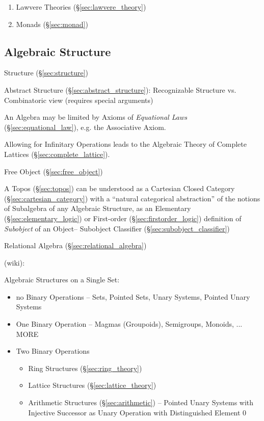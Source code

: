 \begin{enumerate}
  \item Lawvere Theories (\S\ref{sec:lawvere_theory})
  \item Monads (\S\ref{sec:monad})
\end{enumerate}



\subsection{Algebraic Structure}\label{sec:algebraic_structure}

Structure (\S\ref{sec:structure})

Abstract Structure (\S\ref{sec:abstract_structure}): Recognizable
Structure vs. Combinatoric view (requires special arguments)

An Algebra may be limited by Axioms of \emph{Equational Laws}
(\S\ref{sec:equational_law}), e.g. the Associative Axiom.

Allowing for Infinitary Operations leads to the Algebraic Theory of
Complete Lattices (\S\ref{sec:complete_lattice}).

Free Object (\S\ref{sec:free_object})

\fist A Topos (\S\ref{sec:topos}) can be understood as a Cartesian Closed
Category (\S\ref{sec:cartesian_category}) with a ``natural categorical
abstraction'' of the notions of Subalgebra of any Algebraic Structure, as an
Elementary (\S\ref{sec:elementary_logic}) or First-order
(\S\ref{sec:firstorder_logic}) definition of \emph{Subobject} of an Object--
Subobject Classifier (\S\ref{sec:subobject_classifier})

\fist Relational Algebra (\S\ref{sec:relational_algebra})

(wiki):

Algebraic Structures on a Single Set:

\begin{itemize}
  \item no Binary Operations -- Sets, Pointed Sets, Unary Systems, Pointed
    Unary Systems
  \item One Binary Operation -- Magmas (Groupoids), Semigroups, Monoids, ...
    MORE
  \item Two Binary Operations
    \begin{itemize}
      \item Ring Structures (\S\ref{sec:ring_theory})
      \item Lattice Structures (\S\ref{sec:lattice_theory})
      \item Arithmetic Structures (\S\ref{sec:arithmetic}) -- Pointed Unary
        Systems with Injective Successor as Unary Operation with Distinguished
        Element $0$
    \end{itemize}
\end{itemize}

